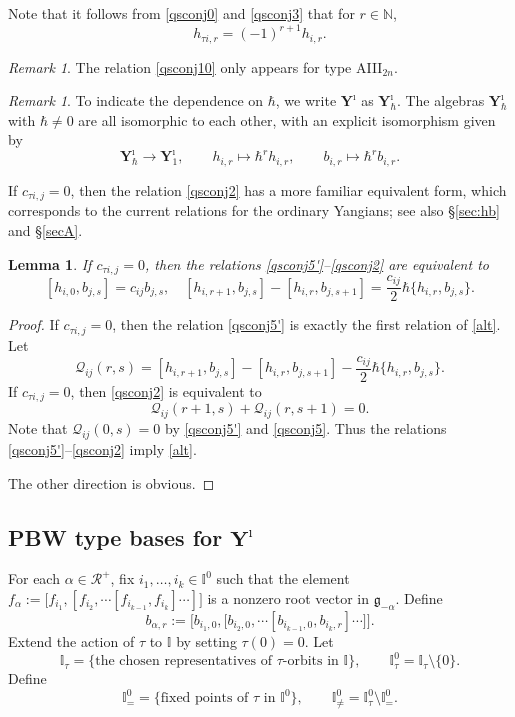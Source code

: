 \documentclass[11pt,reqno]{amsart}
\numberwithin{equation}{section}
\newtheorem{lem}[thm]{Lemma}
\theoremstyle{definition}
\theoremstyle{remark}
\newtheorem{rem}[thm]{Remark}
\newcommand{\beq}{\begin{equation}}
\newcommand{\eeq}{\end{equation}}
\newcommand{\bN}{\mathbb{N}}
\newcommand{\cR}{\mathcal{R}}
\newcommand{\g}{\mathfrak{g}}
\newcommand{\Yi}{{\mathbf{Y}^\imath}}
\newcommand{\blue}[1]{{\color{blue}#1}}
\def \h{\hbar}
\def \H{h}
\def \X{b}
\def \I{\mathbb{I}}
\begin{document}


Note that it follows from \eqref{qsconj0} and \eqref{qsconj3} that for $r\in\bN$,
\beq\label{hrel}
\H_{\tau i,r}=(-1)^{r+1} \H_{i,r}.
\eeq

\begin{rem}\label{rem:newSerre}
The relation \eqref{qsconj10} only appears for type AIII$_{2n}$. 
\end{rem}

\begin{rem}\label{rem:h=1}
To indicate the dependence on $\h$, we write $\Yi$ as $\mathbf Y^\imath_\h$. The algebras $\mathbf Y^\imath_\h$ with $\h\ne 0$ are all isomorphic to each other, with an explicit isomorphism given by
\[
\mathbf Y^\imath_\h\to \mathbf Y^\imath_1,\qquad h_{i,r}\mapsto \h^r h_{i,r},\qquad b_{i,r}\mapsto \h^r b_{i,r}.
\]
\end{rem}
If $c_{\tau i,j}=0$, then the relation \eqref{qsconj2} has a more familiar equivalent form, which corresponds to the current relations for the ordinary Yangians; see also \S\ref{sec:hb} and \S\ref{secA}. 
\begin{lem}\label{typeArel}
If $c_{\tau i,j}=0$, then the relations \eqref{qsconj5'}--\eqref{qsconj2} are equivalent to 
\beq\label{alt}
[h_{i,0},b_{j,s}]=c_{ij}b_{j,s},\quad [h_{i,r+1},b_{j,s} ]-[h_{i,r},b_{j,s+1} ]= \frac{c_{ij}}{2}\h\{h_{i,r},b_{j,s}\}.
\eeq    
\end{lem}
\begin{proof}
If $c_{\tau i,j}=0$, then the relation \eqref{qsconj5'} is exactly the first relation of \eqref{alt}. Let 
\[
\mathscr Q_{ij}(r,s)=[h_{i,r+1},b_{j,s}]-[h_{i,r},b_{j,s+1}]-\frac{c_{ij}}{2} \h\{h_{i,r},b_{j,s}\}.
\]
If $c_{\tau i, j}=0$, then \eqref{qsconj2} is equivalent to
\[
\mathscr Q_{ij}(r+1,s)+\mathscr Q_{ij}(r,s+1)=0.
\]
Note that $\mathscr Q_{ij}(0,s)=0$ by \eqref{qsconj5'} and \eqref{qsconj5}. Thus the relations \eqref{qsconj5'}--\eqref{qsconj2} imply \eqref{alt}. 

The other direction is obvious.
\end{proof}

\subsection{PBW type bases for $\Yi$}\label{sec:pbw}
For each $\alpha\in\cR^+$, fix $i_1,\dots,i_k\in\I^0$ such that the element $f_{\alpha}:=\big[f_{i_1},[f_{i_2},\cdots[f_{i_{k-1}},f_{i_k}]\cdots]\big]$ is a nonzero root vector in $\g_{-\alpha}$. Define
\beq\label{bjir1}
b_{\alpha,r}:=\Big[b_{i_1,0},\big[b_{i_2,0},\cdots[b_{i_{k-1},0},b_{i_k,r}]\cdots\big]\Big].
\eeq
Extend the action of $\tau$ to $\I$ by setting $\tau (0)=0$. Let 
\beq\label{I-tau}
\I_\tau=\{\text{the chosen representatives of $\tau$-orbits in } \I\},\qquad \I_\tau^0=\I_\tau\setminus \{0\}.
\eeq 
Define 
\beq\label{eq:I+-}
\I_=^0 =\{\text{fixed points of $\tau$ in $\I^0$}\},\qquad  \I_{\ne}^0=\I_\tau^0\setminus \I_=^0.
\eeq
\end{document}
